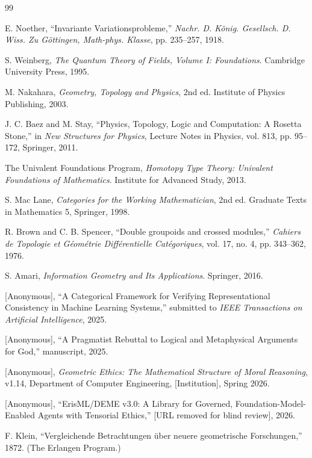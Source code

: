 \documentclass[12pt,letterpaper]{article}
\theoremstyle{definition}
\theoremstyle{remark}
\begin{document}
\begin{thebibliography}{99}

E. Noether, ``Invariante Variationsprobleme,'' \textit{Nachr. D. K\"{o}nig. Gesellsch. D. Wiss. Zu G\"{o}ttingen, Math-phys. Klasse}, pp. 235--257, 1918.

S. Weinberg, \textit{The Quantum Theory of Fields, Volume I: Foundations}. Cambridge University Press, 1995.

M. Nakahara, \textit{Geometry, Topology and Physics}, 2nd ed. Institute of Physics Publishing, 2003.

J. C. Baez and M. Stay, ``Physics, Topology, Logic and Computation: A Rosetta Stone,'' in \textit{New Structures for Physics}, Lecture Notes in Physics, vol. 813, pp. 95--172, Springer, 2011.

The Univalent Foundations Program, \textit{Homotopy Type Theory: Univalent Foundations of Mathematics}. Institute for Advanced Study, 2013.

S. Mac Lane, \textit{Categories for the Working Mathematician}, 2nd ed. Graduate Texts in Mathematics 5, Springer, 1998.

R. Brown and C. B. Spencer, ``Double groupoids and crossed modules,'' \textit{Cahiers de Topologie et G\'{e}om\'{e}trie Diff\'{e}rentielle Cat\'{e}goriques}, vol. 17, no. 4, pp. 343--362, 1976.

S. Amari, \textit{Information Geometry and Its Applications}. Springer, 2016.

[Anonymous], ``A Categorical Framework for Verifying Representational Consistency in Machine Learning Systems,'' submitted to \textit{IEEE Transactions on Artificial Intelligence}, 2025.

[Anonymous], ``A Pragmatist Rebuttal to Logical and Metaphysical Arguments for God,'' manuscript, 2025.

[Anonymous], \emph{Geometric Ethics: The Mathematical Structure of Moral Reasoning}, v1.14, Department of Computer Engineering, [Institution], Spring 2026.

[Anonymous], ``ErisML/DEME v3.0: A Library for Governed, Foundation-Model-Enabled Agents with Tensorial Ethics,'' [URL removed for blind review], 2026.

F. Klein, ``Vergleichende Betrachtungen \"{u}ber neuere geometrische Forschungen,'' 1872. (The Erlangen Program.)


\end{thebibliography}
\end{document}
